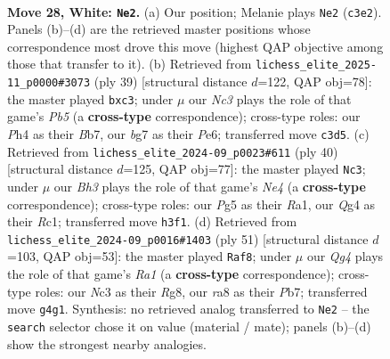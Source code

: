\documentclass[11pt]{article}
\begin{document}
\begin{figure}[p]
\label{fig:thought-m52}
\end{figure}

\clearpage

\begin{figure}[p]\centering
\begin{subfigure}{0.46\textwidth}\centering
\resizebox{\linewidth}{!}{%
\newchessgame
\chessboard[
  setfen={r1b4r/1q3kbp/p1npp1p1/4p1P1/1p2PnQP/2N2P1B/PPPK1B2/R1R5 w - - 0 28},
  showmover=false,
  pgfstyle=straightmove, color=movearrow, markmove={c3-e2}
]}
\caption{}
\end{subfigure}\hfill
\begin{subfigure}{0.46\textwidth}\centering
\resizebox{\linewidth}{!}{%
\newchessgame
\chessboard[
  setfen={r4rk1/1bqp2pp/4p3/p2nP3/1pB1N3/bPP3B1/P1PQ1PPP/K2RR3 b - - 0 20},
  showmover=false,
  pgfstyle=straightmove, color=movearrow, markmove={b4-c3}
]}
\caption{}
\end{subfigure}
\\[4pt]
\begin{subfigure}{0.46\textwidth}\centering
\resizebox{\linewidth}{!}{%
\newchessgame
\chessboard[
  setfen={1r4k1/1pq2pbp/p2p2p1/3Pnb2/PPp1NQ2/6P1/4PPBP/R1R3K1 w - - 2 21},
  showmover=false,
  pgfstyle=straightmove, color=movearrow, markmove={e4-c3}
]}
\caption{}
\end{subfigure}\hfill
\begin{subfigure}{0.46\textwidth}\centering
\resizebox{\linewidth}{!}{%
\newchessgame
\chessboard[
  setfen={r5r1/1p1n1p1k/1pppnqpp/4p2b/PPP1P2N/2NP2PP/R2Q1PBK/5R2 b - - 11 26},
  showmover=false,
  pgfstyle=straightmove, color=movearrow, markmove={a8-f8}
]}
\caption{}
\end{subfigure}
\caption{\textbf{Move 28, White: \texttt{Ne2}.} (a) Our position; Melanie plays \texttt{Ne2} (\texttt{c3e2}). Panels (b)--(d) are the retrieved master positions whose correspondence most drove this move (highest QAP objective among those that transfer to it). (b) Retrieved from \texttt{lichess\_elite\_2025-11\_p0000\#3073} (ply 39) [structural distance $d$=122, QAP obj=78]: the master played \texttt{bxc3}; under $\mu$ our \emph{Nc3} plays the role of that game's \emph{Pb5} (a \textbf{cross-type} correspondence); cross-type roles: our \emph{P}h4 as their \emph{B}b7, our \emph{b}g7 as their \emph{P}e6; transferred move \texttt{c3d5}. (c) Retrieved from \texttt{lichess\_elite\_2024-09\_p0023\#611} (ply 40) [structural distance $d$=125, QAP obj=77]: the master played \texttt{Nc3}; under $\mu$ our \emph{Bh3} plays the role of that game's \emph{Ne4} (a \textbf{cross-type} correspondence); cross-type roles: our \emph{P}g5 as their \emph{R}a1, our \emph{Q}g4 as their \emph{R}c1; transferred move \texttt{h3f1}. (d) Retrieved from \texttt{lichess\_elite\_2024-09\_p0016\#1403} (ply 51) [structural distance $d$=103, QAP obj=53]: the master played \texttt{Raf8}; under $\mu$ our \emph{Qg4} plays the role of that game's \emph{Ra1} (a \textbf{cross-type} correspondence); cross-type roles: our \emph{N}c3 as their \emph{R}g8, our \emph{r}a8 as their \emph{P}b7; transferred move \texttt{g4g1}. Synthesis: no retrieved analog transferred to \texttt{Ne2} -- the \texttt{search} selector chose it on value (material / mate); panels (b)--(d) show the strongest nearby analogies.}

\end{figure}
\end{document}
